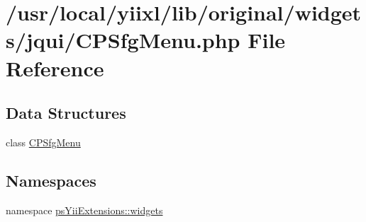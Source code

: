 \hypertarget{CPSfgMenu_8php}{
\section{/usr/local/yiixl/lib/original/widgets/jqui/CPSfgMenu.php File Reference}
\label{CPSfgMenu_8php}
}
\subsection*{Data Structures}
\begin{DoxyCompactItemize}
\item 
class \hyperlink{classCPSfgMenu}{CPSfgMenu}
\end{DoxyCompactItemize}
\subsection*{Namespaces}
\begin{DoxyCompactItemize}
\item 
namespace \hyperlink{namespacepsYiiExtensions_1_1widgets}{psYiiExtensions::widgets}
\end{DoxyCompactItemize}
